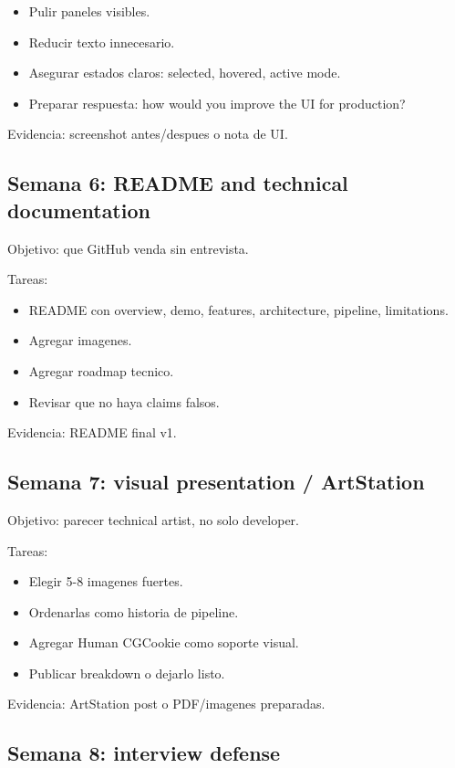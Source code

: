 \begin{itemize}
\item Pulir paneles visibles.
\item Reducir texto innecesario.
\item Asegurar estados claros: selected, hovered, active mode.
\item Preparar respuesta: how would you improve the UI for production?
\end{itemize}


Evidencia: screenshot antes/despues o nota de UI.


\subsection{Semana 6: README and technical documentation}


Objetivo: que GitHub venda sin entrevista.


Tareas:


\begin{itemize}
\item README con overview, demo, features, architecture, pipeline, limitations.
\item Agregar imagenes.
\item Agregar roadmap tecnico.
\item Revisar que no haya claims falsos.
\end{itemize}


Evidencia: README final v1.


\subsection{Semana 7: visual presentation / ArtStation}


Objetivo: parecer technical artist, no solo developer.


Tareas:


\begin{itemize}
\item Elegir 5-8 imagenes fuertes.
\item Ordenarlas como historia de pipeline.
\item Agregar Human CGCookie como soporte visual.
\item Publicar breakdown o dejarlo listo.
\end{itemize}


Evidencia: ArtStation post o PDF/imagenes preparadas.


\subsection{Semana 8: interview defense}


